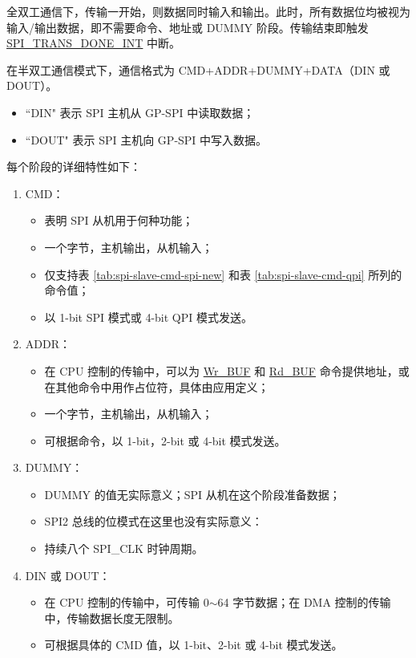 \documentclass[main\_\_CN.tex]{subfiles}
\begin{document}
全双工通信下，传输一开始，则数据同时输入和输出。此时，所有数据位均被视为输入/输出数据，即不需要命令、地址或 DUMMY 阶段。传输结束即触发 \hyperref[int:SPITRANSDONEINT]{SPI\_TRANS\_DONE\_INT} 中断。  

在半双工通信模式下，通信格式为 CMD+ADDR+DUMMY+DATA（DIN 或 DOUT）。
\begin{itemize}
    \item ``DIN" 表示 SPI 主机从 GP-SPI 中读取数据；
    \item ``DOUT" 表示 SPI 主机向 GP-SPI 中写入数据。
\end{itemize}

每个阶段的详细特性如下：

\begin{enumerate} 
   \item CMD： 
        \begin{itemize}
            \item 表明 SPI 从机用于何种功能； 
            \item 一个字节，主机输出，从机输入； 
            \item 仅支持表 \ref{tab:spi-slave-cmd-spi-new} 和表 \ref{tab:spi-slave-cmd-qpi} 所列的命令值；
            \item 以 1-bit SPI 模式或 4-bit QPI 模式发送。
        \end{itemize}
   \item ADDR： 
        \begin{itemize}
            \item 在 CPU 控制的传输中，可以为  \hyperlink{cmd:wrbuf}{Wr\_BUF} 和 \hyperlink{cmd:rdbuf}{Rd\_BUF} 命令提供地址，或在其他命令中用作占位符，具体由应用定义；
            \item 一个字节，主机输出，从机输入；
            \item 可根据命令，以 1-bit，2-bit 或 4-bit 模式发送。
        \end{itemize}
   \item DUMMY： 
        \begin{itemize}
            \item DUMMY 的值无实际意义；SPI 从机在这个阶段准备数据；
            \item SPI2 总线的位模式在这里也没有实际意义：
            \item 持续八个 SPI\_CLK 时钟周期。
        \end{itemize}
   \item DIN 或 DOUT： 
        \begin{itemize}
            \item 在 CPU 控制的传输中，可传输 0$\sim$64 字节数据；在 DMA 控制的传输中，传输数据长度无限制。
            \item 可根据具体的 CMD 值，以 1-bit、2-bit 或 4-bit 模式发送。
        \end{itemize}
   \end{enumerate}
\end{document}
